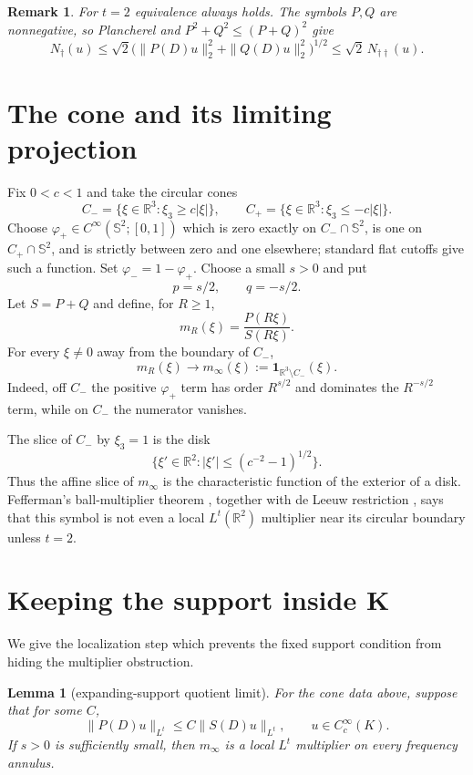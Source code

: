 \documentclass[11pt]{article}
\newtheorem{lemma}[theorem]{Lemma}
\newtheorem{remark}[theorem]{Remark}
\newcommand{\R}{\mathbb R}
\newcommand{\Sph}{\mathbb S}
\begin{document}
\begin{remark}\label{rem:l2}
For $t=2$ equivalence always holds.  The symbols $P,Q$ are nonnegative, so
Plancherel and $P^2+Q^2\leq(P+Q)^2$ give
\[
 N_\dagger(u)\leq
 \sqrt2\bigl(\|P(D)u\|_2^2+\|Q(D)u\|_2^2\bigr)^{1/2}
 \leq\sqrt2\,N_{\dagger\dagger}(u).
\]
\end{remark}

\section{The cone and its limiting projection}

Fix $0<c<1$ and take the circular cones
\[
 C_-=\{\xi\in\R^3:\xi_3\geq c|\xi|\},\qquad
 C_+=\{\xi\in\R^3:\xi_3\leq-c|\xi|\}.
\]
Choose $\varphi_+\in C^\infty(\Sph^2;[0,1])$ which is zero exactly on
$C_-\cap\Sph^2$, is one on $C_+\cap\Sph^2$, and is strictly between zero
and one elsewhere; standard flat cutoffs give such a function.  Set
$\varphi_-=1-\varphi_+$.  Choose a small $s>0$ and put
\[
 p=s/2,\qquad q=-s/2.
\]
Let $S=P+Q$ and define, for $R\geq1$,
\[
 m_R(\xi)=\frac{P(R\xi)}{S(R\xi)}.
\]
For every $\xi\ne0$ away from the boundary of $C_-$,
\begin{equation}\label{eq:limit}
 m_R(\xi)\longrightarrow
 m_\infty(\xi):=\mathbf1_{\R^3\setminus C_-}(\xi).
\end{equation}
Indeed, off $C_-$ the positive $\varphi_+$ term has order $R^{s/2}$ and
dominates the $R^{-s/2}$ term, while on $C_-$ the numerator vanishes.

The slice of $C_-$ by $\xi_3=1$ is the disk
\[
 \{\xi'\in\R^2:|\xi'|\leq(c^{-2}-1)^{1/2}\}.
\]
Thus the affine slice of $m_\infty$ is the characteristic function of the
exterior of a disk.  Fefferman's ball-multiplier theorem
\cite{Fefferman1971}, together with de Leeuw restriction
\cite{deLeeuw1965}, says that this symbol is not even a local
$L^t(\R^2)$ multiplier near its circular boundary unless $t=2$.

\section{Keeping the support inside K}

We give the localization step which prevents the fixed support condition
from hiding the multiplier obstruction.

\begin{lemma}[expanding-support quotient limit]\label{lem:local}
For the cone data above, suppose that for some $C$,
\begin{equation}\label{eq:onepart}
 \|P(D)u\|_{L^t}\leq C\|S(D)u\|_{L^t},
 \qquad u\in C^\infty_c(K).
\end{equation}
If $s>0$ is sufficiently small, then $m_\infty$ is a local $L^t$
multiplier on every frequency annulus.
\end{lemma}
\end{document}
